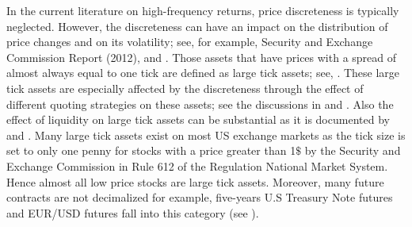 \documentclass[12pt]{article}
\begin{document}
In the current literature on high-frequency returns,
price discreteness is typically neglected.
However, the discreteness can have an impact
on the distribution of price changes and on its volatility; see, for example,
Security and Exchange Commission Report (2012), \nocite{SEC2012}
\citet{CWWanNess2004} and \citet{RonenWeaver2001}.
Those assets that have prices with a spread of almost always equal to one tick
are defined as large tick assets; see, \citet{EislerBK2011}.
These large tick assets are especially affected by the discreteness
through the effect of different quoting strategies on these assets;
see the discussions in \citet{ChordiaS1995} and \citet{CordellaFoucault1999}.
Also the effect of liquidity on large tick assets can be substantial as
it is documented by \citet{OHaraSaarZhong2014} and \citet{YeYao2014}.
Many large tick assets exist on most US exchange markets as the
tick size is set to only one penny for stocks with a
price greater than 1$\$$ by the Security and Exchange Commission
in Rule 612 of the Regulation National Market System.
Hence almost all low price stocks are large tick assets.
Moreover, many future contracts are not decimalized for example, five-years U.S Treasury Note futures and EUR/USD futures
fall into this category (see 
\citet{DayriRosenbaum2013}).


   


\end{document}
